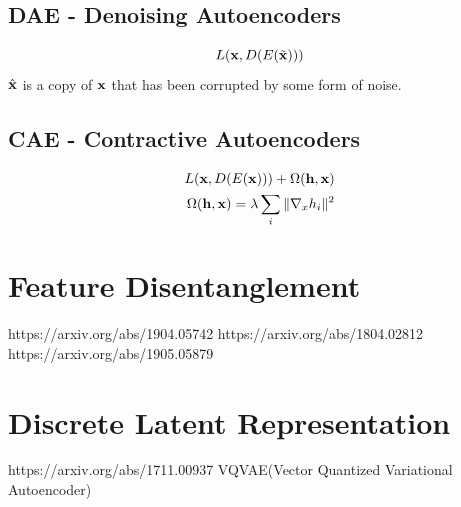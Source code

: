 \subsection{DAE - Denoising Autoencoders}
\begin{equation}
    L(\mathbf{x}, D(E(\tilde{\mathbf{x}})))
\end{equation}
$\hat{\mathbf{x}}$ is a copy of $\mathbf{x}$ that has been corrupted by some form of noise.


\subsection{CAE - Contractive Autoencoders}
\begin{equation}
    \begin{split}
        L(\mathbf{x}, D(E(\mathbf{x}))) + \Omega(\mathbf{h}, \mathbf{x}) \\
        \Omega(\mathbf{h}, \mathbf{x}) = \lambda \sum_i \| \nabla_x h_i \|^2
    \end{split}
\end{equation}


\section{Feature Disentanglement}
https://arxiv.org/abs/1904.05742
https://arxiv.org/abs/1804.02812
https://arxiv.org/abs/1905.05879
\section{Discrete Latent Representation}
https://arxiv.org/abs/1711.00937
VQVAE(Vector Quantized Variational Autoencoder)
